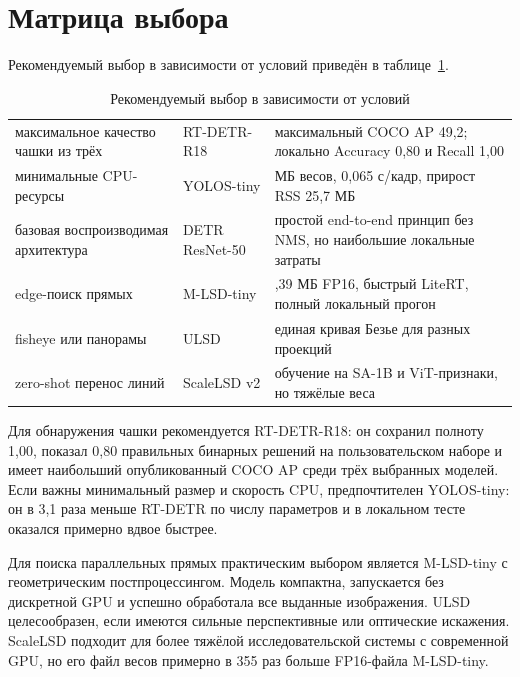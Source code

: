 \documentclass[a4paper,12pt]{extreport}
\begin{document}
\section{Матрица выбора}

Рекомендуемый выбор в зависимости от условий приведён в таблице~\ref{tab:choice}.

\begin{table}[H]
\centering\small
\caption{Рекомендуемый выбор в зависимости от условий}
\label{tab:choice}
\begin{tabularx}{\textwidth}{|>{\raggedright\arraybackslash}p{3.6cm}|>{\raggedright\arraybackslash}p{3.3cm}|>{\raggedright\arraybackslash}X|}
\hline
\multicolumn{1}{|c|}{Условие} & \multicolumn{1}{c|}{Рекомендуемая модель} & \multicolumn{1}{>{\centering\arraybackslash}X|}{Обоснование} \\
\hline
максимальное качество чашки из трёх & RT-DETR-R18 & максимальный COCO AP 49,2; локально Accuracy 0,80 и Recall 1,00\\ \hline
минимальные CPU-ресурсы & YOLOS-tiny & 26 МБ весов, 0,065 с/кадр, прирост RSS 25,7 МБ\\ \hline
базовая воспроизводимая архитектура & DETR ResNet-50 & простой end-to-end принцип без NMS, но наибольшие локальные затраты\\ \hline
edge-поиск прямых & M-LSD-tiny & 1,39 МБ FP16, быстрый LiteRT, полный локальный прогон\\ \hline
fisheye или панорамы & ULSD & единая кривая Безье для разных проекций\\ \hline
zero-shot перенос линий & ScaleLSD v2 & обучение на SA-1B и ViT-признаки, но тяжёлые веса\\
\hline
\end{tabularx}
\end{table}

Для обнаружения чашки рекомендуется RT-DETR-R18: он сохранил полноту 1,00, показал 0,80 правильных бинарных решений на пользовательском наборе и имеет наибольший опубликованный COCO AP среди трёх выбранных моделей. Если важны минимальный размер и скорость CPU, предпочтителен YOLOS-tiny: он в 3,1 раза меньше RT-DETR по числу параметров и в локальном тесте оказался примерно вдвое быстрее.

Для поиска параллельных прямых практическим выбором является M-LSD-tiny с геометрическим постпроцессингом. Модель компактна, запускается без дискретной GPU и успешно обработала все выданные изображения. ULSD целесообразен, если имеются сильные перспективные или оптические искажения. ScaleLSD подходит для более тяжёлой исследовательской системы с современной GPU, но его файл весов примерно в 355 раз больше FP16-файла M-LSD-tiny.
\end{document}
